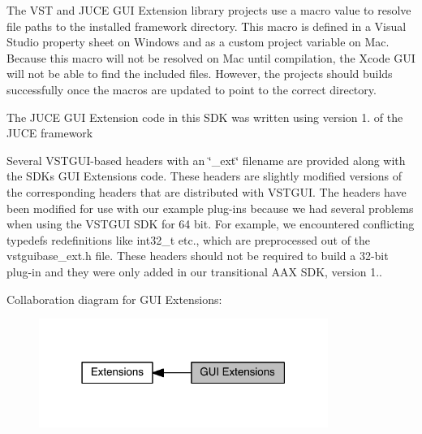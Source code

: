 \begin{DoxyItemize}
\item The V\+S\+T and J\+U\+C\+E G\+U\+I Extension library projects use a macro value to resolve file paths to the installed framework directory. This macro is defined in a Visual Studio property sheet on Windows and as a custom project variable on Mac. Because this macro will not be resolved on Mac until compilation, the Xcode G\+U\+I will not be able to find the included files. However, the projects should builds successfully once the macros are updated to point to the correct directory.
\item The J\+U\+C\+E G\+U\+I Extension code in this S\+D\+K was written using version 1. of the J\+U\+C\+E framework
\item Several V\+S\+T\+G\+U\+I-\/based headers with an \char`\"{}\+\_\+ext\char`\"{} filename are provided along with the S\+D\+K\textquotesingle{}s G\+U\+I Extensions code. These headers are slightly modified versions of the corresponding headers that are distributed with V\+S\+T\+G\+U\+I. The headers have been modified for use with our example plug-\/ins because we had several problems when using the V\+S\+T\+G\+U\+I S\+D\+K for 64 bit. For example, we encountered conflicting typedefs redefinitions like int32\+\_\+t etc., which are preprocessed out of the vstguibase\+\_\+ext.\+h file. These headers should not be required to build a 32-\/bit plug-\/in and they were only added in our transitional A\+A\+X S\+D\+K, version 1.. 
\end{DoxyItemize}Collaboration diagram for G\+U\+I Extensions\+:
\nopagebreak
\begin{figure}[H]
\begin{center}
\leavevmode
\includegraphics[width=267pt]{a00368}
\end{center}
\end{figure}
